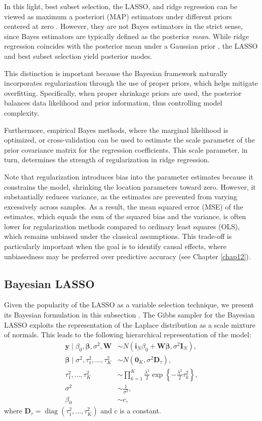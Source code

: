 In this light, best subset selection, the LASSO, and ridge regression can be viewed as maximum a posteriori (MAP) estimators under different priors centered at zero \cite{Park2008}. However, they are not Bayes estimators in the strict sense, since Bayes estimators are typically defined as the posterior \textit{mean}. While ridge regression coincides with the posterior mean under a Gaussian prior \cite{Ishwaran2005}, the LASSO and best subset selection yield posterior modes.

This distinction is important because the Bayesian framework naturally incorporates regularization through the use of proper priors, which helps mitigate overfitting. Specifically, when proper shrinkage priors are used, the posterior balances data likelihood and prior information, thus controlling model complexity.

Furthermore, empirical Bayes methods, where the marginal likelihood is optimized, or cross-validation can be used to estimate the scale parameter of the prior covariance matrix for the regression coefficients. This scale parameter, in turn, determines the strength of regularization in ridge regression.

Note that regularization introduces bias into the parameter estimates because it constrains the model, shrinking the location parameters toward zero. However, it substantially reduces variance, as the estimates are prevented from varying excessively across samples. As a result, the mean squared error (MSE) of the estimates, which equals the sum of the squared bias and the variance, is often lower for regularization methods compared to ordinary least squares (OLS), which remains unbiased under the classical assumptions. This trade-off is particularly important when the goal is to identify causal effects, where unbiasedness may be preferred over predictive accuracy (see Chapter \ref{chap12}).

\subsection{Bayesian LASSO}\label{sec13_21}
Given the popularity of the LASSO as a variable selection technique, we present its Bayesian formulation in this subsection \cite{Park2008}. The Gibbs sampler for the Bayesian LASSO exploits the representation of the Laplace distribution as a scale mixture of normals. This leads to the following hierarchical representation of the model:
\begin{align*}
	\mathbf{y} \mid \beta_0, \boldsymbol{\beta}, \sigma^2, \mathbf{W} &\sim {N}(\mathbf{i}_N \beta_0 + \mathbf{W} \boldsymbol{\beta}, \sigma^2 \mathbf{I}_N), \\
	\boldsymbol{\beta} \mid \sigma^2, \tau_1^2, \dots, \tau_K^2 &\sim {N}(\mathbf{0}_K, \sigma^2 \mathbf{D}_{\tau}), \\
	\tau_1^2, \dots, \tau_K^2 &\sim \prod_{k=1}^K \frac{\lambda^2}{2} \exp\left\{ -\frac{\lambda^2}{2} \tau_k^2 \right\}, \\
	\sigma^2 &\sim \frac{1}{\sigma^2},\\
	\beta_0&\sim c,
\end{align*}
where $\mathbf{D}_{\tau} = \operatorname{diag}(\tau_1^2, \dots, \tau_K^2)$ and $c$ is a constant. 

